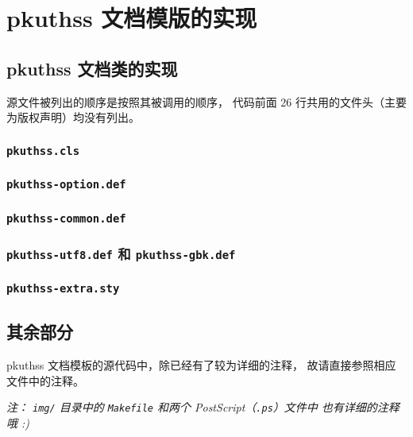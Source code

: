 \chapter{pkuthss 文档模版的实现}
\raggedbottom %

	\section{pkuthss 文档类的实现}
	源文件被列出的顺序是按照其被调用的顺序，
	代码前面 26 行共用的文件头（主要为版权声明）均没有列出。

		\subsection{\texttt{pkuthss.cls}}

		\subsection{\texttt{pkuthss-option.def}}

		\subsection{\texttt{pkuthss-common.def}}

		\subsection{\texttt{pkuthss-utf8.def} 和 \texttt{pkuthss-gbk.def}}

		\subsection{\texttt{pkuthss-extra.sty}}

	\section{其余部分} %

	pkuthss 文档模板的源代码中，除已经有了较为详细的注释，
	故请直接参照相应文件中的注释。

	\emph
	{%
		注：%
		\texttt{img/} 目录中的 %
		\texttt{Makefile} 和两个 PostScript（\texttt{.ps}）文件中%
		也有详细的注释哦 :)
	}

\flushbottom %

